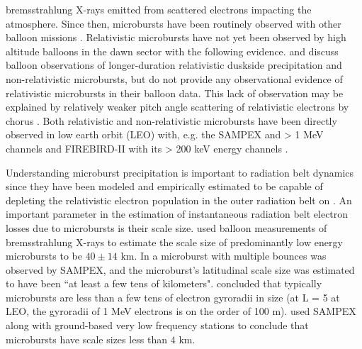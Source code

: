 \documentclass[draft, linenumbers]{agujournal}
\begin{document}
 \citet{Anderson1964}   bremsstrahlung X-rays emitted from scattered  electrons impacting the atmosphere. Since then,  microbursts have been routinely observed with other balloon missions \citep{Parks1967, Woodger2015, Anderson2017}. Relativistic microbursts have not yet been observed by high altitude balloons in the dawn sector with the following evidence. \citet{Millan2002} and \citet{Woodger2015} discuss balloon observations of longer-duration relativistic duskside precipitation and non-relativistic microbursts, but do not provide any observational evidence of relativistic microbursts in their balloon data. This lack of observation may be explained by relatively weaker pitch angle scattering of relativistic electrons by chorus \citep{Lee2012}. Both relativistic and non-relativistic microbursts have been directly observed in low earth orbit (LEO) with, e.g. the SAMPEX  and > 1 MeV channels \citep{Nakamura1995, Nakamura2000, Blake1996, Lorentzen2001a, Lorentzen2001b, O'Brien2003, O'Brien2004, Blum2015} and FIREBIRD-II with its > 200 keV energy channels \citep{Crew2016, Anderson2017, Breneman2017}.  

Understanding microburst precipitation is important to radiation belt dynamics since they have been modeled and empirically estimated to be capable of depleting the relativistic electron population in the outer radiation belt on  \citep{O'Brien2004, Thorne2005, Shprits2007, Breneman2017}. An important parameter in the estimation of instantaneous radiation belt electron losses due to microbursts is their scale size. \citet{Parks1967} used balloon measurements of bremsstrahlung X-rays to estimate the scale size of predominantly low energy microbursts to be $40 \pm 14$ km. In \citet{Blake1996} a microburst with multiple bounces was observed by  SAMPEX, and the microburst's latitudinal scale size was estimated to have been ``at least a few tens of kilometers".  concluded that typically microbursts are less than a few tens of electron gyroradii in size (at L = 5 at LEO, the gyroradii of 1 MeV electrons is on the order of 100 m). \citet{Dietrich2010} used SAMPEX along with ground-based very low frequency stations to conclude that microbursts have scale sizes less than $4$ km.
\end{document}
